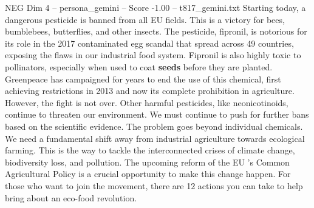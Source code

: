 \begin{textsample}{NEG Dim 4 – persona\_gemini – Score -1.00 – t817\_gemini.txt}  \label{ex:f4_neg_002}
Starting today, a dangerous pesticide is banned from all EU fields.
This is a victory for bees, bumblebees, butterflies, and other insects.
The pesticide, fipronil, is notorious for its role in the 2017 contaminated egg scandal that spread across 49 countries, exposing the flaws in our industrial food system.
Fipronil is also highly toxic to pollinators, especially when used to coat \textbf{seeds} before they are planted.
Greenpeace has campaigned for years to end the use of this chemical, first achieving restrictions in 2013 and now its complete prohibition in agriculture.
However, the fight is not over.
Other harmful pesticides, like neonicotinoids, continue to threaten our environment.
We must continue to push for further bans based on the scientific evidence.
The problem goes beyond individual chemicals.
We need a fundamental shift away from industrial agriculture towards ecological farming.
This is the way to tackle the interconnected crises of climate change, biodiversity loss, and pollution.
The upcoming reform of the EU ’s Common Agricultural Policy is a crucial opportunity to make this change happen.
For those who want to join the movement, there are 12 actions you can take to help bring about an eco-food revolution.

\end{textsample}
